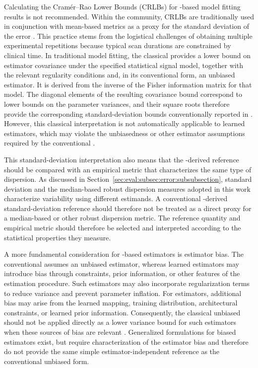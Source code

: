 Calculating the Cram\'{e}r--Rao Lower Bounds (CRLBs) for \DL-based model fitting results is not recommended. Within the \MRS community, CRLBs are traditionally used in conjunction with mean-based metrics as a proxy for the standard deviation of the error \cite{Landheer2021b}. This practice stems from the logistical challenges of obtaining multiple experimental repetitions because typical \MRS scan durations are constrained by clinical time. In traditional model fitting, the classical \CRLB provides a lower bound on estimator covariance under the specified statistical signal model, together with the relevant regularity conditions and, in its conventional form, an unbiased estimator. It is derived from the inverse of the Fisher information matrix for that model. The diagonal elements of the resulting covariance bound correspond to lower bounds on the parameter variances, and their square roots therefore provide the corresponding standard-deviation bounds conventionally reported in \MRS. However, this classical interpretation is not automatically applicable to learned \DL estimators, which may violate the unbiasedness or other estimator assumptions required by the conventional \CRLB.

This standard-deviation interpretation also means that the \CRLB-derived reference should be compared with an empirical metric that characterizes the same type of dispersion. As discussed in Section~\ref{sec:eval:subsec:error:subsubsection}, standard deviation and the median-based robust dispersion measures adopted in this work characterize variability using different estimands. A conventional \CRLB-derived standard-deviation reference should therefore not be treated as a direct proxy for a median-based or other robust dispersion metric. The reference quantity and empirical metric should therefore be selected and interpreted according to the statistical properties they measure.

A more fundamental consideration for \DL-based estimators is estimator bias. The conventional \CRLB assumes an unbiased estimator, whereas learned estimators may introduce bias through constraints, prior information, or other features of the estimation procedure. Such estimators may also incorporate regularization terms to reduce variance and prevent parameter inflation. For \DL estimators, additional bias may arise from the learned mapping, training distribution, architectural constraints, or learned prior information. Consequently, the classical unbiased \CRLB should not be applied directly as a lower variance bound for such estimators when these sources of bias are relevant \cite{Fessler1996}. Generalized \CRLB formulations for biased estimators exist, but require characterization of the estimator bias and therefore do not provide the same simple estimator-independent reference as the conventional unbiased form.

